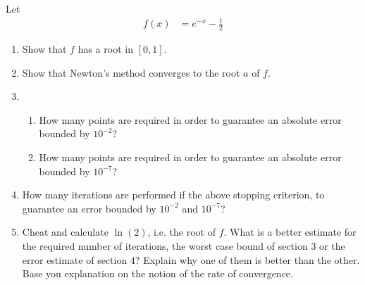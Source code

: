 \documentclass[fleqn, a4paper, 11pt, oneside]{amsart}
\theoremstyle{definition}
\theoremstyle{theorem}
\begin{document}
\begin{question}
	Let
	\begin{align*}
		f(x) & = e^{-x} - \frac{1}{2}
	\end{align*}
	\begin{enumerate}
		\item
			Show that $f$ has a root in $[0,1]$.
		\item
			Show that Newton's method converges to the root $a$ of $f$.
		\item
			\begin{enumerate}
				\item How many points are required in order to guarantee an absolute error bounded by $10^{-2}$?
				\item How many points are required in order to guarantee an absolute error bounded by $10^{-7}$?
			\end{enumerate}
		\item
			How many iterations are performed if the above stopping criterion, to guarantee an error bounded by $10^{-2}$ and $10^{-7}$?
		\item
			Cheat and calculate $\ln(2)$, i.e. the root of $f$.
			What is a better estimate for the required number of iterations, the worst case bound of section 3 or the error estimate of section 4?
			Explain why one of them is better than the other.
			Base you explanation on the notion of the rate of convergence.
	\end{enumerate}
\end{question}
\end{document}
